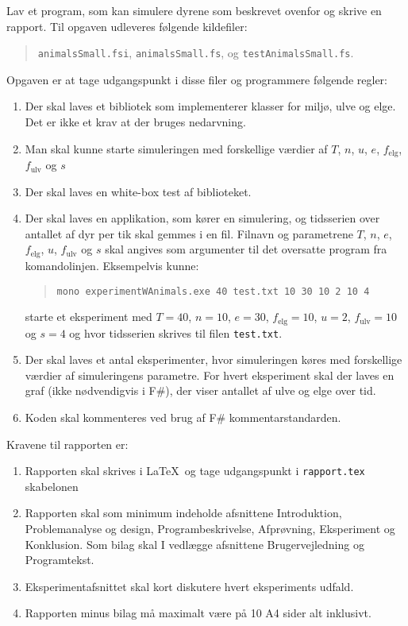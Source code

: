 Lav et program, som kan simulere dyrene som beskrevet ovenfor og skrive en rapport. Til opgaven udleveres følgende kildefiler:
\begin{quote}
\lstinline[language=console]{animalsSmall.fsi}, \lstinline[language=console]{animalsSmall.fs}, og \lstinline[language=console]{testAnimalsSmall.fs}.
\end{quote}
Opgaven er at tage udgangspunkt i disse filer og programmere følgende regler:
\begin{enumerate}
\item Der skal laves et bibliotek som implementerer klasser for miljø, ulve og elge. Det er ikke et krav at der bruges nedarvning.
\item Man skal kunne starte simuleringen med forskellige værdier af $T$, $n$, $u$, $e$, $f_{\text{elg}}$, $f_{\text{ulv}}$ og $s$
\item Der skal laves en white-box test af biblioteket.
\item Der skal laves en applikation, som kører en simulering, og tidsserien over antallet af dyr per tik skal gemmes i en fil. Filnavn og parametrene $T$, $n$, $e$, $f_{\text{elg}}$, $u$, $f_{\text{ulv}}$ og $s$ skal angives som argumenter til det oversatte program fra komandolinjen. Eksempelvis kunne:
  \begin{quote}
    \lstinline[language=console]{mono experimentWAnimals.exe 40 test.txt 10 30 10 2 10 4}
  \end{quote}
  starte et eksperiment med $T=40$, $n=10$, $e=30$, $f_{\text{elg}}=10$, $u=2$, $f_{\text{ulv}}=10$ og $s=4$ og hvor tidsserien skrives til filen \lstinline[language=console]{test.txt}.
\item Der skal laves et antal eksperimenter, hvor simuleringen køres med forskellige værdier af simuleringens parametre. For hvert eksperiment skal der laves en graf (ikke nødvendigvis i F\#), der viser antallet af ulve og elge over tid.
\item Koden skal kommenteres ved brug af F\# kommentarstandarden.
\end{enumerate}
Kravene til rapporten er:
\begin{enumerate}[resume]
\item Rapporten skal skrives i \LaTeX\ og tage udgangspunkt i \texttt{rapport.tex} skabelonen
\item Rapporten skal som minimum indeholde afsnittene Introduktion, Problemanalyse og design, Programbeskrivelse, Afprøvning, Eksperiment og Konklusion. Som bilag skal I vedlægge afsnittene Brugervejledning og Programtekst.
\item Eksperimentafsnittet skal kort diskutere hvert eksperiments udfald.
\item Rapporten minus bilag må maximalt være på 10 A4 sider alt inklusivt.
\end{enumerate}
